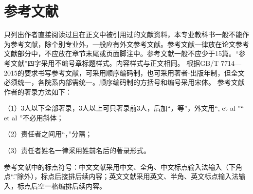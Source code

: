 \newpage
\chapter*{参考文献}
只列出作者直接阅读过且在正文中被引用过的文献资料，本专业教科书一般不能作为参考文献，除个别专业外，一般应有外文参考文献。参考文献一律放在论文参考文献部分中，不应放在章节末尾或页面脚注中。参考文献一般不应少于15篇。“参考文献”四字采用不编号章标题样式。内容样式与正文相同。
根据GB/T 7714—2015的要求书写参考文献，可采用顺序编码制，也可采用著者-出版年制，但全文必须统一，各院系内部需统一。顺序编码制的方括号和编号采用宋体。
参考文献作者的著录方法如下：

（1）3人以下全部著录，3人以上可只著录前3人，后加“，等”，外文用“, et al ”“ et al ”不必用斜体；

（2）责任者之间用“，”分隔；

（3）责任者姓名一律采用姓前名后的著录形式。

参考文献中的标点符号：中文文献采用中文、全角、中文标点输入法输入（下角点“.”除外），标点后接排后续内容；英文文献采用英文、半角、英文标点输入法输入，标点后空一格编排后续内容。

\printbibliography[heading=none]